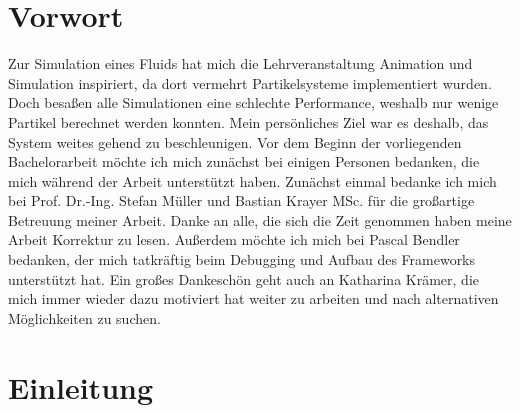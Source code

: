 \documentclass[intern,palatino]{cgBA}
\begin{document}

\section{Vorwort}\label{vorwort}

Zur Simulation eines Fluids hat mich die Lehrveranstaltung Animation und Simulation inspiriert, da dort vermehrt Partikelsysteme implementiert wurden. Doch besaßen alle Simulationen eine schlechte Performance, weshalb nur wenige Partikel berechnet werden konnten. Mein persönliches Ziel war es deshalb, das System weites gehend zu beschleunigen.
\newline \newline
Vor dem Beginn der vorliegenden Bachelorarbeit möchte ich mich zunächst bei einigen Personen bedanken, die mich während der Arbeit unterstützt haben.
\newline \newline
Zunächst einmal bedanke ich mich bei Prof. Dr.-Ing. Stefan Müller und Bastian Krayer MSc. für die großartige Betreuung meiner Arbeit.
\newline
Danke  an alle, die sich die Zeit genommen haben meine Arbeit Korrektur zu lesen.
\newline
Außerdem möchte ich mich bei Pascal Bendler bedanken, der mich tatkräftig beim Debugging und Aufbau des Frameworks unterstützt hat.
\newline
Ein großes Dankeschön geht auch an Katharina Krämer, die mich immer wieder dazu motiviert hat weiter zu arbeiten und nach alternativen Möglichkeiten zu suchen.
\newpage


\section{Einleitung}\label{einleitung}
\end{document}
